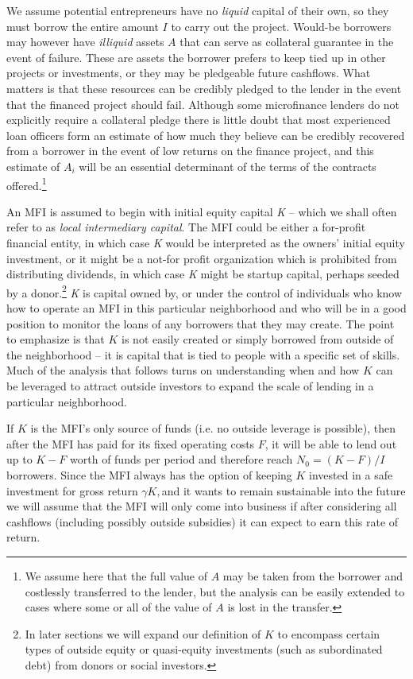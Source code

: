 \documentclass{article} %
\begin{document}
We assume potential entrepreneurs have no \textit{liquid} capital of their own, so they must borrow the entire amount $I$ to carry out the project. Would-be borrowers may however have \textit{illiquid} assets $A$ that can serve as collateral guarantee in the event of failure.  These are assets the borrower prefers to keep tied up in other projects or investments, or they may be pledgeable future cashflows.  What matters is that these resources can be credibly pledged to the lender in the event that the financed project should fail.  Although some microfinance lenders do not explicitly require a collateral pledge there is little doubt that most experienced loan officers form an estimate of how much they believe can be credibly recovered from a borrower in the event of low returns on the finance project, and this estimate of $A_{i} $ will be an essential determinant of the terms of the contracts offered.\footnote{  We assume here that the full value of   $A$   may be taken from the borrower and costlessly transferred to the lender, but the analysis can be easily extended to cases where some or all of the value of  $A$   is lost in the transfer. } 

 

An MFI is assumed to begin with initial equity capital \textit{K} -- which we shall often refer to as \textit{local intermediary capital}.  The MFI could be either a for-profit financial entity, in which case \textit{K} would be interpreted as the owners' initial equity investment, or it might be a not-for profit organization which is prohibited from distributing dividends, in which case \textit{K} might be startup capital, perhaps seeded by a donor.\footnote{  In later sections we will expand our definition of   $K$   to encompass certain types of outside equity or quasi-equity investments (such as subordinated debt) from donors or social investors. }  \textit{K} is capital owned by, or under the control of individuals who know how to operate an MFI in this particular neighborhood and who will be in a good position to monitor the loans of any borrowers that they may create.  The point to emphasize is that $K$ is not easily created or simply borrowed from outside of the neighborhood -- it is capital that is tied to people with a specific set of skills.  Much of the analysis that follows turns on understanding when and how $K$ can be leveraged to attract outside investors to expand the scale of lending in a particular neighborhood. 

If $K$ is the MFI's only source of funds (i.e. no outside leverage is possible), then after the MFI has paid for its fixed operating costs $F$, it will be able to lend out up to $K-F$ worth of funds per period and therefore reach $N_{0} =(K-F)/I$ borrowers.  Since the MFI always has the option of keeping $K$ invested in a safe investment for gross return $\gamma K,$and it wants to remain sustainable into the future we will assume that the MFI will only come into business if after considering all cashflows (including possibly outside subsidies) it can expect to earn this rate of return. 
\end{document}
